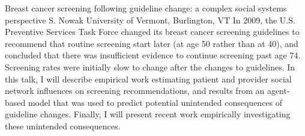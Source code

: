 
    \begin{abstract_online}{Breast cancer screening following guideline change: a complex social systems perspective}{%
        S. Nowak}{%
        }{%
        University of Vermont, Burlington, VT}
    In 2009, the U.S. Preventive Services Task Force changed its breast cancer screening guidelines to recommend that routine screening start later (at age 50 rather than at 40), and concluded that there was insufficient evidence to continue screening past age 74. Screening rates were initially slow to change after the changes to guidelines. In this talk, I will describe empirical work estimating patient and provider social network influences on screening recommendations, and results from an agent-based model that was used to predict potential unintended consequences of guideline changes. Finally, I will present recent work empirically investigating these unintended consequences. 
    
    \end{abstract_online}
    